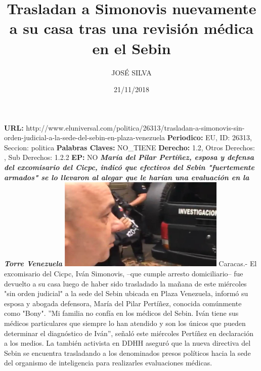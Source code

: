 \documentclass{article}%
\title{\textbf{Trasladan a Simonovis nuevamente a su casa tras una revisión médica en el Sebin}}%
\author{JOSÉ SILVA}%
\date{21/11/2018}%
\begin{document}
%
\normalsize%
\maketitle%
\textbf{URL: }%
http://www.eluniversal.com/politica/26313/trasladan{-}a{-}simonovis{-}sin{-}orden{-}judicial{-}a{-}la{-}sede{-}del{-}sebin{-}en{-}plaza{-}venezuela\newline%
%
\textbf{Periodico: }%
EU, %
ID: %
26313, %
Seccion: %
politica\newline%
%
\textbf{Palabras Claves: }%
NO\_TIENE\newline%
%
\textbf{Derecho: }%
1.2, %
Otros Derechos: %
, %
Sub Derechos: %
1.2.2\newline%
%
\textbf{EP: }%
NO\newline%
\newline%
%
\textbf{\textit{María del Pilar Pertíñez, esposa y defensa del excomisario del Cicpc, indicó que efectivos del Sebin "fuertemente armados" se lo llevaron al alegar que le harían una evaluación en la Torre Venezuela}}%
\newline%
\newline%
%
\includegraphics[width=300px]{128.jpg}%
\newline%
%
Caracas.{-} El excomisario del Cicpc, Iván Simonovis, –que cumple arresto domiciliario– fue devuelto a su casa luego de haber sido trasladado la mañana de este miércoles "sin orden judicial" a la sede del Sebin ubicada en Plaza Venezuela, informó su esposa y abogada defensora, María del Pilar Pertíñez, conocida comúnmente como "Bony".%
\newline%
%
”Mi familia no confía en los médicos del Sebin. Iván tiene sus médicos particulares que siempre lo han atendido y son los únicos que pueden determinar el diagnóstico de Iván”, señaló este miércoles Pertíñez en declaración a los medios.%
\newline%
%
La también activista en DDHH aseguró que la nueva directiva del Sebin se encuentra trasladando a los denominados presos políticos hacia la sede del organismo de inteligencia para realizarles evaluaciones médicas.%
\newline%
%
\end{document}

